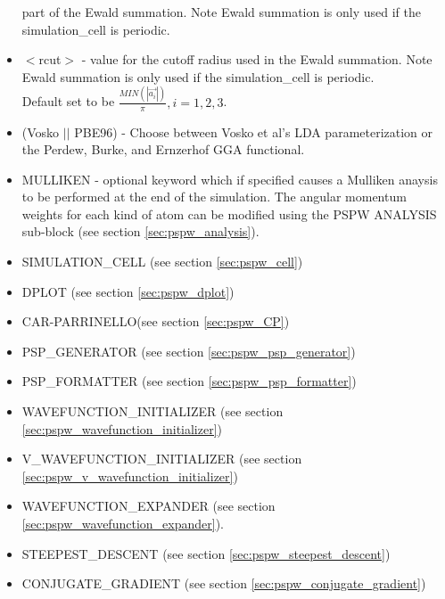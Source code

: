 \begin{itemize}
                          part of the Ewald summation. Note Ewald summation
                          is only used if the simulation\_cell is periodic.
        \item $<$rcut$>$ - value for the cutoff radius used
                          in the Ewald summation. Note Ewald summation
                          is only used if the simulation\_cell is periodic. \\
                           Default set to be
                          $\frac{MIN(\left| \vec{a_i} \right|)}{\pi}, i=1,2,3$.
        \item (Vosko $||$ PBE96) - Choose between Vosko et al's LDA 
                               parameterization or the Perdew, Burke, 
                               and Ernzerhof GGA functional.
        \item MULLIKEN - optional keyword which if specified
                         causes a Mulliken anaysis to be performed at
                         the end of the simulation.  The angular momentum
                         weights for each kind of atom can be modified using 
                         the PSPW ANALYSIS sub-block (see section \ref{sec:pspw_analysis}).

        \item SIMULATION\_CELL (see section \ref{sec:pspw_cell})
        \item DPLOT (see section \ref{sec:pspw_dplot})
        \item CAR-PARRINELLO(see section \ref{sec:pspw_CP})
        \item PSP\_GENERATOR (see section \ref{sec:pspw_psp_generator})
        \item PSP\_FORMATTER (see section \ref{sec:pspw_psp_formatter})
        \item WAVEFUNCTION\_INITIALIZER (see section \ref{sec:pspw_wavefunction_initializer})
        \item V\_WAVEFUNCTION\_INITIALIZER (see section \ref{sec:pspw_v_wavefunction_initializer})
        \item WAVEFUNCTION\_EXPANDER (see section \ref{sec:pspw_wavefunction_expander}).
        \item STEEPEST\_DESCENT (see section \ref{sec:pspw_steepest_descent})
        \item CONJUGATE\_GRADIENT (see section \ref{sec:pspw_conjugate_gradient})
\end{itemize}

